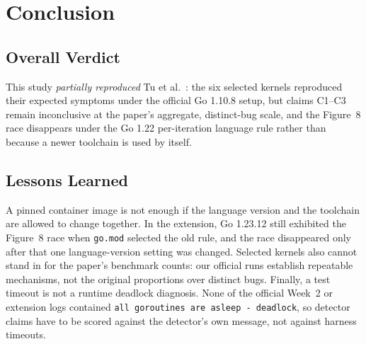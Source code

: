 \section{Conclusion}
\label{sec:conclusion}

\subsection{Overall Verdict}
This study \emph{partially reproduced} Tu et al.~\cite{tu2019go}: the six
selected kernels reproduced their expected symptoms under the official
Go 1.10.8 setup, but claims C1--C3 remain inconclusive at the paper's
aggregate, distinct-bug scale, and the Figure~8 race disappears under the
Go 1.22 per-iteration language rule rather than because a newer toolchain
is used by itself.

\subsection{Lessons Learned}
A pinned container image is not enough if the language version and the
toolchain are allowed to change together. In the extension, Go 1.23.12 still
exhibited the Figure~8 race when \texttt{go.mod} selected the old rule, and
the race disappeared only after that one language-version setting was
changed. Selected kernels also cannot stand in for the paper's benchmark
counts: our official runs establish repeatable mechanisms, not the original
proportions over distinct bugs. Finally, a test timeout is not a runtime
deadlock diagnosis. None of the official Week~2 or extension logs contained
\texttt{all goroutines are asleep - deadlock}, so detector claims have to be
scored against the detector's own message, not against harness timeouts.
